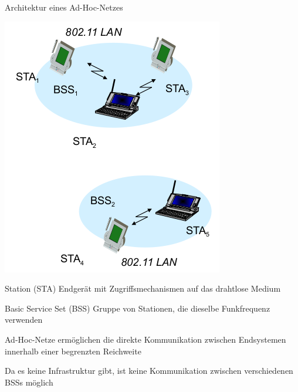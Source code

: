 \documentclass[a4paper]{article}
\begin{document}
\begin{multicols}{3}
      Architektur eines Ad-Hoc-Netzes
      \begin{multicols}{2}
            \includegraphics[width=.8\linewidth]{Assets/NetworkSecurity-802.11-ad-hoc-architecture.png}

            \begin{description*}
                  \item[Station (STA)] Endgerät mit Zugriffsmechanismen auf das drahtlose Medium
                  \item[Basic Service Set (BSS)] Gruppe von Stationen, die dieselbe Funkfrequenz verwenden
                  \item[Ad-Hoc-Netze] ermöglichen die direkte Kommunikation zwischen Endsystemen innerhalb einer begrenzten Reichweite
                  \item Da es keine Infrastruktur gibt, ist keine Kommunikation zwischen verschiedenen BSSs möglich
            \end{description*}
      \end{multicols}


\end{multicols}
\end{document}
